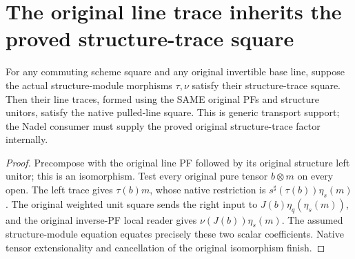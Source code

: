 \section{The original line trace inherits the proved structure-trace square}

\begin{lemma}
\label{lem:kn-native-line-trace-square-from-structure}
\leanok
For any commuting scheme square and any original invertible base line,
suppose the actual structure-module morphisms $\tau,\nu$ satisfy their
structure-trace square. Then their line traces, formed using the SAME
original PFs and structure unitors, satisfy the native pulled-line
square. This is generic transport support; the Nadel consumer must
supply the proved original structure-trace factor internally.
\end{lemma}
\begin{proof}
Precompose with the original line PF followed by its original structure
left unitor; this is an isomorphism. Test every original pure tensor
$b\otimes m$ on every open. The left trace gives $\tau(b)m$, whose
native restriction is $s^\sharp(\tau(b))\eta_s(m)$. The original
weighted unit square sends the right input to
$J(b)\eta_q(\eta_s(m))$, and the original inverse-PF local reader
gives $\nu(J(b))\eta_s(m)$. The assumed structure-module equation
equates precisely these two scalar coefficients. Native tensor
extensionality and cancellation of the original isomorphism finish.
\end{proof}
